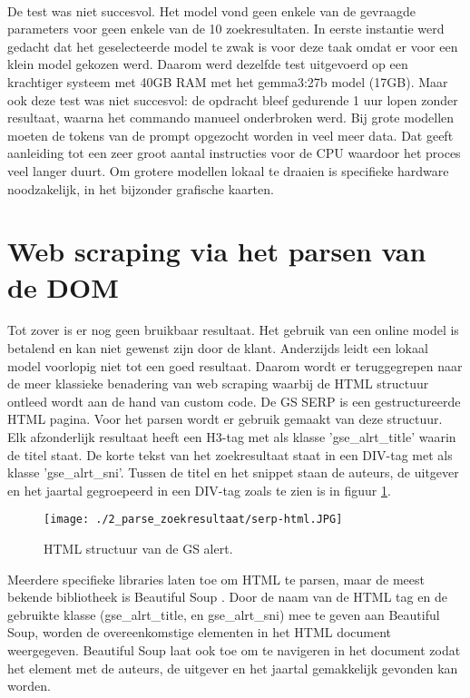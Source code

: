 \\
De test was niet succesvol. Het model vond geen enkele van de gevraagde parameters voor geen enkele van de 10 zoekresultaten.
In eerste instantie werd gedacht dat het geselecteerde model te zwak is voor deze taak omdat er voor een klein model gekozen werd. Daarom werd dezelfde test uitgevoerd op een krachtiger systeem met 40GB RAM met het gemma3:27b model (17GB). Maar ook deze test was niet succesvol: de opdracht bleef gedurende 1 uur lopen zonder resultaat, waarna het commando manueel onderbroken werd. Bij grote modellen moeten de tokens van de prompt opgezocht worden in veel meer data. Dat geeft aanleiding tot een zeer groot aantal instructies voor de CPU waardoor het proces veel langer duurt. Om grotere modellen lokaal te draaien is specifieke hardware noodzakelijk, in het bijzonder grafische kaarten. 
\section{Web scraping via het parsen van de DOM}
Tot zover is er nog geen bruikbaar resultaat. Het gebruik van een online model is betalend en kan niet gewenst zijn door de klant. Anderzijds leidt een lokaal model voorlopig niet tot een goed resultaat. Daarom wordt er teruggegrepen naar de meer klassieke benadering van web scraping waarbij de HTML structuur ontleed wordt aan de hand van custom code.
De GS SERP is een gestructureerde HTML pagina. Voor het parsen wordt er gebruik gemaakt van deze structuur.
Elk afzonderlijk resultaat heeft een H3-tag met als klasse 'gse\_alrt\_title' waarin de titel staat. De korte tekst van het zoekresultaat staat in een DIV-tag met als klasse 'gse\_alrt\_sni'. Tussen de titel en het snippet staan de auteurs, de uitgever en het jaartal gegroepeerd in een DIV-tag zoals te zien is in figuur \ref{fig:serp_html}.
\begin{figure}[h!]
    \centering
    \texttt{[image: ./2\_parse\_zoekresultaat/serp-html.JPG]}
    \caption[HTML structuur van de GS alert.]{\label{fig:serp_html}HTML structuur van de GS alert.}
\end{figure}
\FloatBarrier
Meerdere specifieke libraries laten toe om HTML te parsen, maar de meest bekende bibliotheek is Beautiful Soup \autocite{Soup2025}. Door de naam van de HTML tag en de gebruikte klasse (gse\_alrt\_title, en gse\_alrt\_sni) mee te geven aan Beautiful Soup, worden de overeenkomstige elementen in het HTML document weergegeven. Beautiful Soup laat ook toe om te navigeren in het document zodat het element met de auteurs, de uitgever en het jaartal gemakkelijk gevonden kan worden.\\

